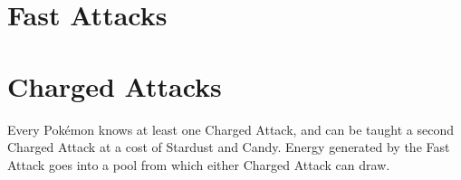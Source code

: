 \section{Fast Attacks}

\section{Charged Attacks}
Every Pokémon knows at least one Charged Attack, and can be taught a second
Charged Attack at a cost of Stardust and Candy. Energy generated by the Fast
Attack goes into a pool from which either Charged Attack can draw.
